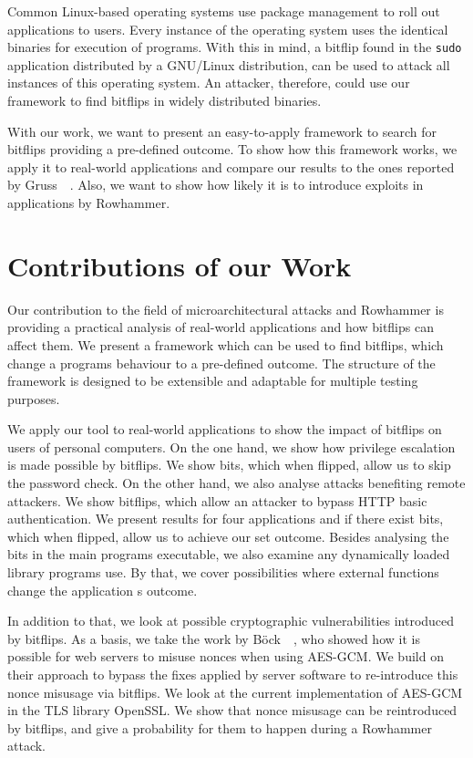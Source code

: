 Common Linux-based operating systems use package management to roll out
applications to users. Every instance of the operating system uses the
identical binaries for execution of programs. With this in mind, a bitflip
found in the \texttt{sudo} application distributed by a GNU/Linux
distribution, can be used to attack all instances of this operating system. An
attacker, therefore, could use our framework to find bitflips in widely
distributed binaries.

With our work, we want to present an easy-to-apply framework to search for
bitflips providing a pre-defined outcome. To show how this framework works, we
apply it to real-world applications and compare our results to the ones reported
by Gruss~\etal~\cite{flipinthewall}. Also, we want to show how likely it is to
introduce exploits in applications by Rowhammer.

\section{Contributions of our Work}

Our contribution to the field of microarchitectural attacks and Rowhammer is
providing a practical analysis of real-world applications and how bitflips can
affect them. We present a framework which can be used to find bitflips, which
change a program\textquotesingle s behaviour to a pre-defined outcome. The
structure of the framework is designed to be extensible and adaptable for
multiple testing purposes.

We apply our tool to real-world applications to show the impact of bitflips
on users of personal computers. On the one hand, we show how privilege
escalation is made possible by bitflips. We show bits, which when flipped, allow
us to skip the password check. On the other hand, we also analyse attacks
benefiting remote attackers. We show bitflips, which allow an attacker to bypass
HTTP basic authentication. We present results for four applications and if there
exist bits, which when flipped, allow us to achieve our set outcome. Besides
analysing the bits in the main program\textquotesingle s executable, we also
examine any dynamically loaded library programs use. By that, we cover
possibilities where external functions change the application\textquotesingle
s outcome.

In addition to that, we look at possible cryptographic vulnerabilities
introduced by bitflips. As a basis, we take the work by
Böck~\etal~\cite{gcmnonceattack}, who showed how it is possible for web servers
to misuse nonces when using AES-GCM. We build on their approach to bypass the
fixes applied by server software to re-introduce this nonce misusage via
bitflips. We look at the current implementation of AES-GCM in the TLS
library OpenSSL. We show that nonce misusage can be reintroduced by bitflips,
and give a probability for them to happen during a Rowhammer attack.


